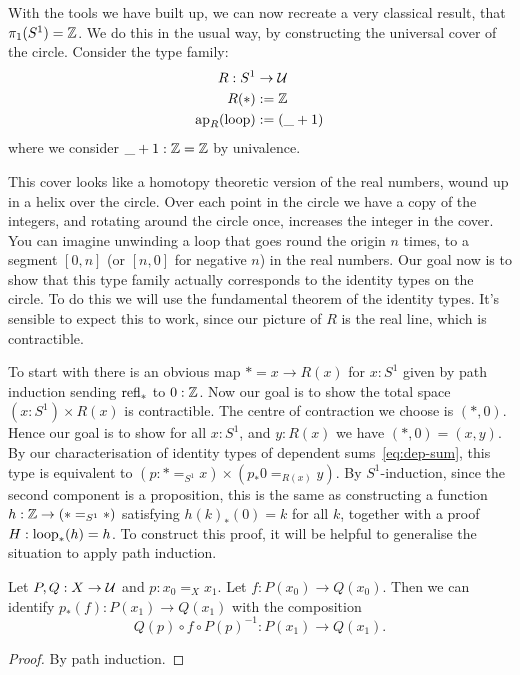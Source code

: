 \documentclass[10pt,oneside,leqno,openright]{memoir}
\begin{document}
With the tools we have built up, we can now recreate a very classical result, that $\pi_1(S^1) = \mathbb{Z}$.
We do this in the usual way, by constructing the universal cover of the circle.
Consider the type family:
\begin{align*}
    R : S^1 &\to \mathcal{U} \\
    R(\ast) &:= \mathbb{Z} \\
    \operatorname{ap}_R(\mathrm{loop}) &:= ( \_ + 1 )
\end{align*}
where we consider $\_ + 1 : \mathbb{Z} = \mathbb{Z}$ by univalence.

This cover looks like a homotopy theoretic version of the real numbers, wound up in a helix over the circle.
Over each point in the circle we have a copy of the integers, and rotating around the circle once, increases the integer in the cover.
You can imagine unwinding a loop that goes round the origin $n$ times, to a segment $[0, n]$ (or $[n,0]$ for negative $n$) in the real numbers.
Our goal now is to show that this type family actually corresponds to the identity types on the circle.
To do this we will use the fundamental theorem of the identity types.
It's sensible to expect this to work, since our picture of $R$ is the real line, which is contractible.

To start with there is an obvious map $\ast = x \to R(x)$ for $x : S^1$
given by path induction sending $\mathrm{refl}_\ast$ to $0 : \mathbb{Z}$.
Now our goal is to show the total space $(x : S^1) \times R(x)$ is contractible.
The centre of contraction we choose is $(\ast, 0)$.
Hence our goal is to show for all $x : S^1$, and $y : R(x)$ we have $(\ast, 0) = (x, y)$.
By our characterisation of identity types of dependent sums~\eqref{eq:dep-sum}, this type is equivalent to $(p : \ast =_{S^1} x) \times (p_*0 =_{R(x)} y)$.
By $S^1$-induction, since the second component is a proposition, this is the same as constructing a function
$h : \mathbb{Z} \to (\ast =_{S^1} \ast)$
satisfying $h(k)_*(0) = k$ for all $k$, together with
a proof
$H : {\mathrm{loop}}_*(h) = h$.
To construct this proof, it will be helpful to generalise the situation to apply path induction.

\begin{lemma}
\label{lem:trp-fun}
    Let $P,Q : X \to \mathcal{U}$ and $p : x_0 =_X x_1$.
    Let $f : P(x_0) \to Q(x_0)$.
    Then we can identify $p_*(f) : P(x_1) \to Q(x_1)$ with the composition
    \[ Q(p) \circ f \circ P(p)^{-1} : P(x_1) \to Q(x_1).\]
\end{lemma}
\begin{proof}
  By path induction.
\end{proof}
\end{document}
